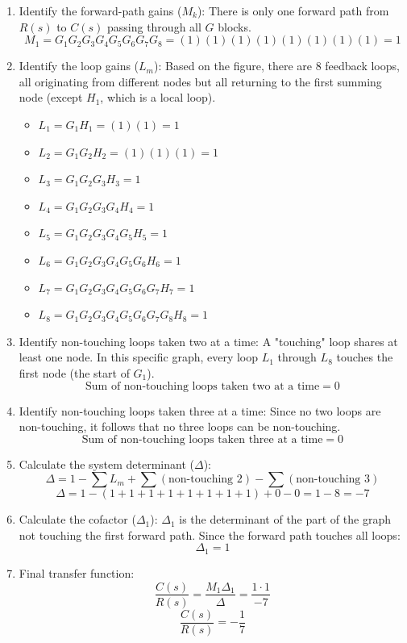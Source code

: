 \documentclass[11pt]{article}
\begin{document}
\begin{enumerate}[label=(\alph*), itemindent=*, leftmargin=*, nolistsep]
    \item Identify the forward-path gains ($M_k$):
    There is only one forward path from $R(s)$ to $C(s)$ passing through all $G$ blocks.
    \[
    M_1 = G_1 G_2 G_3 G_4 G_5 G_6 G_7 G_8 = (1)(1)(1)(1)(1)(1)(1)(1) = 1
    \]

    \item Identify the loop gains ($L_m$):
    Based on the figure, there are 8 feedback loops, all originating from different nodes but all returning to the first summing node (except $H_1$, which is a local loop).
    \begin{itemize}
        \item $L_1 = G_1 H_1 = (1)(1) = 1$
        \item $L_2 = G_1 G_2 H_2 = (1)(1)(1) = 1$
        \item $L_3 = G_1 G_2 G_3 H_3 = 1$
        \item $L_4 = G_1 G_2 G_3 G_4 H_4 = 1$
        \item $L_5 = G_1 G_2 G_3 G_4 G_5 H_5 = 1$
        \item $L_6 = G_1 G_2 G_3 G_4 G_5 G_6 H_6 = 1$
        \item $L_7 = G_1 G_2 G_3 G_4 G_5 G_6 G_7 H_7 = 1$
        \item $L_8 = G_1 G_2 G_3 G_4 G_5 G_6 G_7 G_8 H_8 = 1$
    \end{itemize}

    \item Identify non-touching loops taken two at a time:
    A "touching" loop shares at least one node. In this specific graph, every loop $L_1$ through $L_8$ touches the first node (the start of $G_1$).
    \[
    \text{Sum of non-touching loops taken two at a time} = 0
    \]

    \item Identify non-touching loops taken three at a time:
    Since no two loops are non-touching, it follows that no three loops can be non-touching.
    \[
    \text{Sum of non-touching loops taken three at a time} = 0
    \]

    \item Calculate the system determinant ($\Delta$):
    \[
    \Delta = 1 - \sum L_m + \sum (\text{non-touching 2}) - \sum (\text{non-touching 3})
    \]
    \[
    \Delta = 1 - (1 + 1 + 1 + 1 + 1 + 1 + 1 + 1) + 0 - 0 = 1 - 8 = -7
    \]

    \item Calculate the cofactor ($\Delta_1$):
    $\Delta_1$ is the determinant of the part of the graph not touching the first forward path. Since the forward path touches all loops:
    \[
    \Delta_1 = 1
    \]

    \item Final transfer function:
    \[
    \frac{C(s)}{R(s)} = \frac{M_1 \Delta_1}{\Delta} = \frac{1 \cdot 1}{-7}
    \]
    \[
    \boxed{
    \frac{C(s)}{R(s)} = -\frac{1}{7}
    }
    \]

\end{enumerate}
\end{document}
